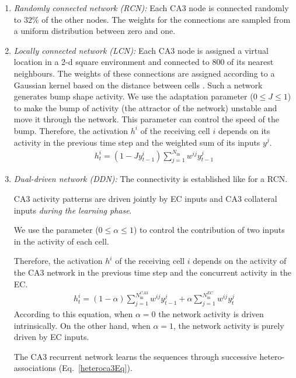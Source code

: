 \documentclass[utf8]{frontiersSCNS} %
\begin{document}
\begin{enumerate}
\item \textit{Randomly connected network (RCN):} Each CA3 node is connected randomly to $32\%$ of the other nodes. The weights for the connections are sampled from a uniform distribution between zero and one. 

\item \textit{Locally connected network (LCN):} Each CA3 node is assigned a virtual location in a 2-d square environment and connected to $800$ of its nearest neighbours. The weights of these connections are assigned according to a Gaussian kernel based on the distance between cells \cite{azizi2013computational}. 
Such a network generates bump shape activity. We use the adaptation parameter ($0 \leq J \leq 1$) to make the bump of activity (the attractor of the network) unstable and move it through the network. This parameter can control the speed of the bump. 
Therefore, the activation $h^i$ of the receiving cell $i$ depends on its activity in the previous time step and the weighted sum of its inputs $y^j$.
\begin{align}
\label{eq:adaptation}
h^{i}_{t} = (1 - J y^{i}_{t-1}) \sum_{j = 1}^{N_\mathrm{in}} {{w^{ij} y^{j}_{t-1}}}
\end{align}

\item \textit{Dual-driven network (DDN):} The connectivity is established like for a RCN.

CA3 activity patterns are driven jointly by EC inputs and CA3 collateral inputs \textit{during the learning phase}.

We use the parameter ($0 \leq \alpha \leq 1$) to control the contribution of two inputs in the activity of each cell. 

Therefore, the activation $h^i$ of the receiving cell $i$ depends on the activity of the CA3 network in the previous time step and the concurrent activity in the EC.
\begin{align}
\label{eq:adaptation}
h^{i}_{t} = (1 - \alpha) \sum_{j = 1}^{N^{CA3}_\mathrm{in}} {{w^{ij} y^{j}_{t-1}}} + \alpha \sum_{j = 1}^{N^{EC}_\mathrm{in}} {{w^{ij} y^{j}_{t}}} 
\end{align}
According to this equation, when $\alpha = 0$ the network activity is driven intrinsically. On the other hand, when $\alpha = 1$, the network activity is purely driven by EC inputs.     

The CA3 recurrent network learns the sequences through successive hetero-associations (Eq.~\ref{heteroca3Eq}).
\end{enumerate}
\end{document}
